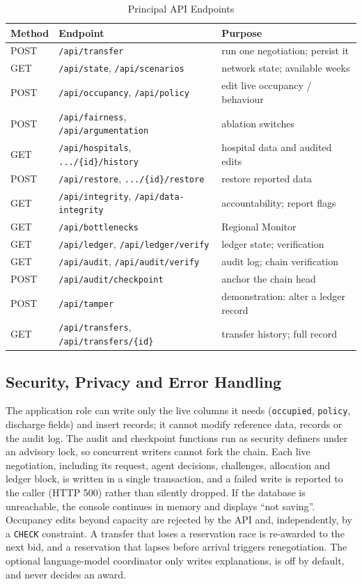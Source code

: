 \begin{table}[!t]
\centering
\caption{Principal API Endpoints}
\label{tab:api}
\scriptsize
\setlength{\tabcolsep}{2.5pt}
\begin{tabular}{@{}lp{3.55cm}p{2.55cm}@{}}
\toprule
Method & Endpoint & Purpose \\
\midrule
POST & \texttt{/api/transfer} & run one negotiation; persist it \\
GET  & \texttt{/api/state}, \texttt{/api/scenarios} & network state; available weeks \\
POST & \texttt{/api/occupancy}, \texttt{/api/policy} & edit live occupancy / behaviour \\
POST & \texttt{/api/fairness}, \texttt{/api/argumentation} & ablation switches \\
GET  & \texttt{/api/hospitals}, \texttt{.../\{id\}/history} & hospital data and audited edits \\
POST & \texttt{/api/restore}, \texttt{.../\{id\}/restore} & restore reported data \\
GET  & \texttt{/api/integrity}, \texttt{/api/data-integrity} & accountability; report flags \\
GET  & \texttt{/api/bottlenecks} & Regional Monitor \\
GET  & \texttt{/api/ledger}, \texttt{/api/ledger/verify} & ledger state; verification \\
GET  & \texttt{/api/audit}, \texttt{/api/audit/verify} & audit log; chain verification \\
POST & \texttt{/api/audit/checkpoint} & anchor the chain head \\
POST & \texttt{/api/tamper} & demonstration: alter a ledger record \\
GET  & \texttt{/api/transfers}, \texttt{/api/transfers/\{id\}} & transfer history; full record \\
\bottomrule
\end{tabular}
\end{table}

\subsection{Security, Privacy and Error Handling}
The application role can write only the live columns it needs (\texttt{occupied}, \texttt{policy}, discharge fields) and insert records; it cannot modify reference data, records or the audit log. The audit and checkpoint functions run as security definers under an advisory lock, so concurrent writers cannot fork the chain. Each live negotiation, including its request, agent decisions, challenges, allocation and ledger block, is written in a single transaction, and a failed write is reported to the caller (HTTP 500) rather than silently dropped. If the database is unreachable, the console continues in memory and displays ``not saving''. Occupancy edits beyond capacity are rejected by the API and, independently, by a \texttt{CHECK} constraint. A transfer that loses a reservation race is re-awarded to the next bid, and a reservation that lapses before arrival triggers renegotiation. The optional language-model coordinator only writes explanations, is off by default, and never decides an award.

